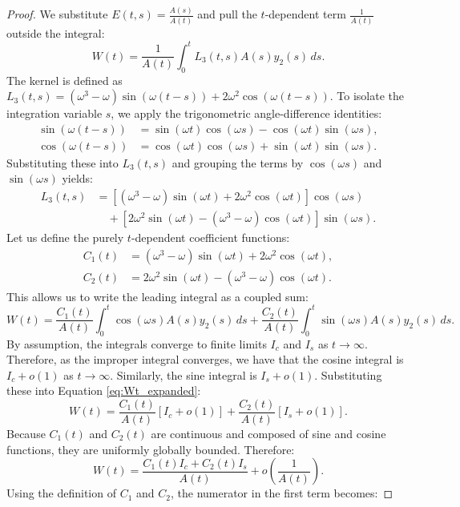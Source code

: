 \documentclass[10pt,reqno]{amsart}
\theoremstyle{definition}
\begin{document}
	\begin{proof}
		We substitute $E(t, s) = \frac{A(s)}{A(t)}$ and pull the $t$-dependent term $\frac{1}{A(t)}$ outside the integral:
	\[ W(t) = \frac{1}{A(t)} \int_0^t L_3(t, s) A(s) y_2(s) \, ds. \]
	The kernel is defined as $L_3(t, s) = (\omega^3 - \omega) \sin(\omega(t-s)) + 2\omega^2 \cos(\omega(t-s))$. To isolate the integration variable $s$, we apply the trigonometric angle-difference identities:
	\begin{align*}
		\sin(\omega(t-s)) &= \sin(\omega t)\cos(\omega s) - \cos(\omega t)\sin(\omega s), \\
		\cos(\omega(t-s)) &= \cos(\omega t)\cos(\omega s) + \sin(\omega t)\sin(\omega s).
	\end{align*}
	Substituting these into $L_3(t, s)$ and grouping the terms by $\cos(\omega s)$ and $\sin(\omega s)$ yields:
	\begin{align*}
		L_3(t, s) &= \left[ (\omega^3 - \omega)\sin(\omega t) + 2\omega^2\cos(\omega t) \right] \cos(\omega s) \\
		&\quad + \left[ 2\omega^2\sin(\omega t) - (\omega^3 - \omega)\cos(\omega t) \right] \sin(\omega s).
	\end{align*}
	Let us define the purely $t$-dependent coefficient functions:
	\begin{align*}
		C_1(t) &= (\omega^3 - \omega)\sin(\omega t) + 2\omega^2\cos(\omega t), \\
		C_2(t) &= 2\omega^2\sin(\omega t) - (\omega^3 - \omega)\cos(\omega t).
	\end{align*}
	This allows us to write the leading integral as a coupled sum:
	\begin{equation} \label{eq:Wt_expanded}
		W(t) = \frac{C_1(t)}{A(t)} \int_0^t \cos(\omega s) A(s) y_2(s) \, ds + \frac{C_2(t)}{A(t)} \int_0^t \sin(\omega s) A(s) y_2(s) \, ds.
	\end{equation}
	By assumption, the integrals converge to finite limits $I_c$ and $I_s$ as $t \to \infty$. Therefore, as the improper integral converges, we have that the cosine integral is $I_c + o(1)$ as $t\to\infty$. Similarly, the sine integral is $I_s + o(1)$.
			Substituting these into Equation \eqref{eq:Wt_expanded}:
	\[ W(t) = \frac{C_1(t)}{A(t)} [I_c + o(1)] + \frac{C_2(t)}{A(t)} [I_s + o(1)]. \]
	Because $C_1(t)$ and $C_2(t)$ are continuous and composed of sine and cosine functions, they are uniformly globally bounded.  Therefore:
	\[ W(t) = \frac{C_1(t) I_c + C_2(t) I_s}{A(t)} + o\left(\frac{1}{A(t)}\right). \]
	Using the definition of $C_1$ and $C_2$, the numerator in the first term becomes:

\end{proof}
\end{document}
